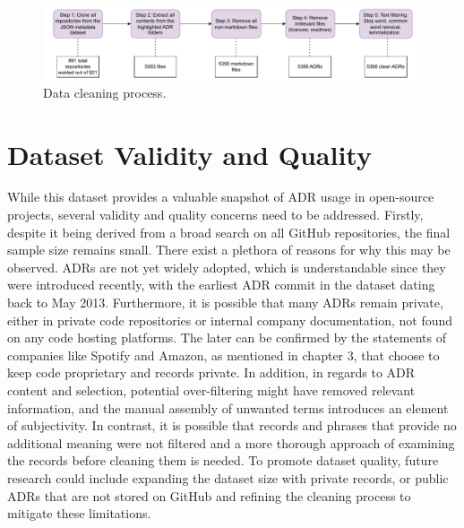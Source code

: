         \begin{figure}[ht]
            \centering
            \includegraphics[width=\textwidth]{figures/data_cleaning_steps_final2.pdf}
            \caption{Data cleaning process.}
            \label{fig:Data_cleaning_steps}
        \end{figure}
        
    \section{Dataset Validity and Quality}
    While this dataset provides a valuable snapshot of ADR usage in open-source projects, several validity and quality concerns need to be addressed. Firstly, despite it being derived from a broad search on all GitHub repositories, the final sample size remains small. There exist a plethora of reasons for why this may be observed. ADRs are not yet widely adopted, which is understandable since they were introduced recently, with the earliest ADR commit in the dataset dating back to May 2013. Furthermore, it is possible that many ADRs remain private, either in private code repositories or internal company documentation, not found on any code hosting platforms. The later can be confirmed by the statements of companies like Spotify and Amazon, as mentioned in chapter 3, that choose to keep code proprietary and records private.
    In addition, in regards to ADR content and selection, potential over-filtering might have removed relevant information, and the manual assembly of unwanted terms introduces an element of subjectivity. In contrast, it is possible that records and phrases that provide no additional meaning were not filtered and a more thorough approach of examining the records before cleaning them is needed. To promote dataset quality, future research could include expanding the dataset size with private records, or public ADRs that are not stored on GitHub and refining the cleaning process to mitigate these limitations. 